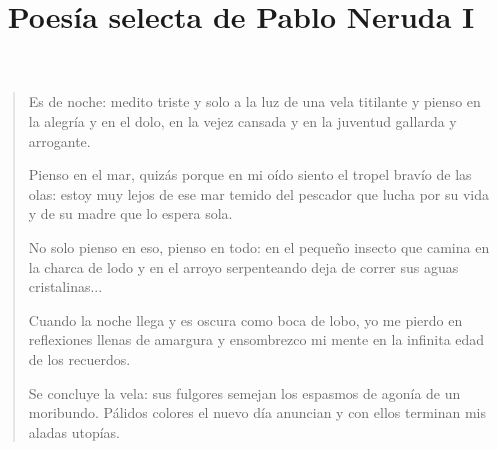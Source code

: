 \documentclass[12pt]{article}
\date{}
\title{Poesía selecta de Pablo Neruda I}
\begin{document}
\maketitle
\tableofcontents

\clearpage
{}
\begin{verse}
Es de noche: medito triste y solo  
a la luz de una vela titilante  
y pienso en la alegría y en el dolo,  
en la vejez cansada  
y en la juventud gallarda y arrogante.  
  
Pienso en el mar, quizás porque en mi oído  
siento el tropel bravío de las olas:  
estoy muy lejos de ese mar temido  
del pescador que lucha por su vida  
y de su madre que lo espera sola.  
  
No solo pienso en eso, pienso en todo:  
en el pequeño insecto que camina  
en la charca de lodo  
y en el arroyo serpenteando deja de correr sus aguas cristalinas...  
  
Cuando la noche llega y es oscura  
como boca de lobo, yo me pierdo  
en reflexiones llenas de amargura  
y ensombrezco mi mente  
en la infinita edad de los recuerdos.  
  
Se concluye la vela: sus fulgores  
semejan los espasmos de agonía  
de un moribundo. Pálidos colores  
el nuevo día anuncian y con ellos  
terminan mis aladas utopías.

\end{verse}
\end{document}
